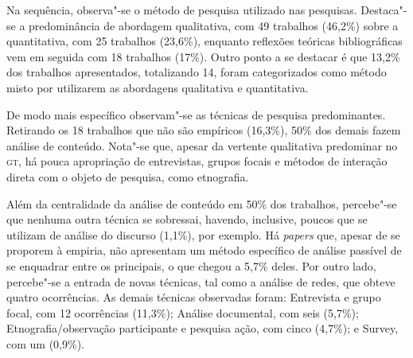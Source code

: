 Na sequência, observa"-se o método de pesquisa utilizado nas pesquisas.
Destaca"-se a predominância de abordagem qualitativa, com 49 trabalhos (46,2\%) sobre a
quantitativa, com 25 trabalhos (23,6\%), enquanto reflexões teóricas bibliográficas vem em
seguida com 18 trabalhos (17\%). Outro ponto a se destacar é que 13,2\% dos trabalhos
apresentados, totalizando 14, foram categorizados como método misto por utilizarem as
abordagens qualitativa e quantitativa.

De modo mais específico observam"-se as técnicas de pesquisa
predominantes. Retirando os 18 trabalhos que não são empíricos (16,3\%),
50\% dos demais fazem análise de conteúdo. Nota"-se que, apesar da
vertente qualitativa predominar no \textsc{gt}, há pouca apropriação de
entrevistas, grupos focais e métodos de interação direta com o objeto de
pesquisa, como etnografia.

Além da centralidade da análise de conteúdo em 50\% dos trabalhos,
percebe"-se que nenhuma outra técnica se sobressai, havendo, inclusive,
poucos que se utilizam de análise do discurso (1,1\%), por exemplo. Há
\emph{papers} que, apesar de se proporem à empiria, não apresentam um
método específico de análise passível de se enquadrar entre os
principais, o que chegou a 5,7\% deles. Por outro lado, percebe"-se a
entrada de novas técnicas, tal como a análise de redes, que obteve
quatro ocorrências. As demais técnicas observadas foram: Entrevista e grupo focal, com 12 ocorrências (11,3\%); Análise documental, com seis (5,7\%); Etnografia/observação
participante e pesquisa ação, com cinco (4,7\%); e Survey, com um (0,9\%).


